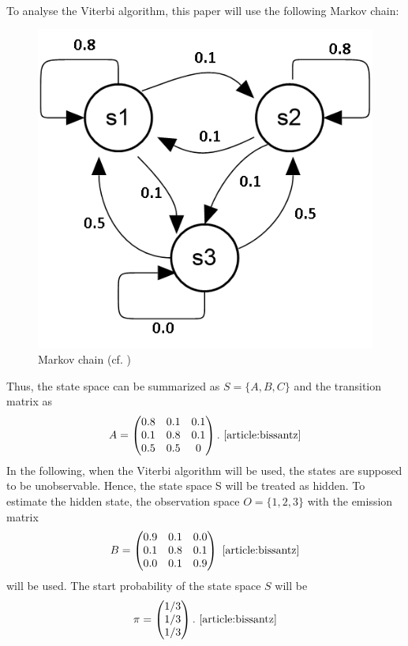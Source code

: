 \documentclass[12pt,journal,compsoc]{IEEEtran}
\begin{document}
\\
To analyse the Viterbi algorithm, this paper will use the following Markov chain: 
\begin{figure}[ht]
	\centering	
  	\includegraphics[scale=0.65]{figures/fig2_HiddenStates.png}
	\caption{Markov chain (cf. \cite{article:bissantz})}
	\label{fig2}
\end{figure}

Thus, the state space can be summarized as $S=\{A, B, C\}$ and the transition matrix as 
\[
  A=\begin{pmatrix}
 0.8 & 0.1 & 0.1 \\
 0.1 & 0.8 & 0.1 \\
 0.5 & 0.5 & 0 
  \end{pmatrix}
. \text{ \cite{article:bissantz}}\]
In the following, when the Viterbi algorithm will be used, the states are supposed to be unobservable. Hence, the state space S will be treated as hidden. To estimate the hidden state, the observation space $O=\{1, 2, 3\}$ with the emission matrix 
\[
  B=\begin{pmatrix}
 0.9 & 0.1 & 0.0 \\
 0.1 & 0.8 & 0.1 \\
 0.0 & 0.1 & 0.9 
  \end{pmatrix}
\text{ \cite{article:bissantz}}\]
will be used. The start probability of the state space $S$  will be 
\[
  \pi=\begin{pmatrix}
 1/3  \\
  1/3 \\
  1/3
  \end{pmatrix}.
\text{ \cite{article:bissantz}}\]
\end{document}
